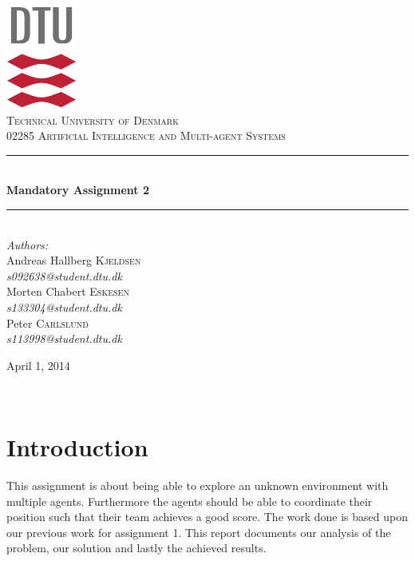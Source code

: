 \documentclass[11pt]{report}
\newcommand{\HRule}{\rule{\linewidth}{0.5mm}}
\begin{document}
\begin{titlepage}
\begin{center}

\includegraphics[scale=2.0]{../GFX/dtu_logo.pdf}\\[1cm]

\textsc{\LARGE Technical University of Denmark}\\[1.5cm]

\textsc{\Large 02285 Artificial Intelligence and Multi-agent Systems}\\[0.5cm]

\HRule \\[0.4cm]
{\huge \bfseries Mandatory Assignment 2}\\[0.1cm]
\HRule \\[1.5cm]

\large
\emph{Authors:}
\\[10pt]
Andreas Hallberg \textsc{Kjeldsen}\\
\emph{s092638@student.dtu.dk}
\\[10pt]
Morten Chabert \textsc{Eskesen}\\
\emph{s133304@student.dtu.dk}
\\[10pt]
Peter \textsc{Carlslund}\\
\emph{s113998@student.dtu.dk}

\vfill

{\large April 1, 2014}

\end{center}
\end{titlepage}

${}$
\section*{Introduction}
This assignment is about being able to explore an unknown environment with multiple agents. Furthermore the agents should be able to coordinate their position such that their team achieves a good score. The work done is based upon our previous work for assignment 1. This report documents our analysis of the problem, our solution and lastly the achieved results.
\end{document}
